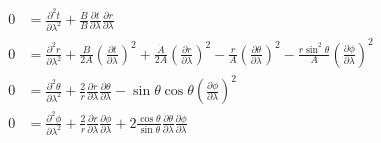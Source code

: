 \begin{subequations}
    \begin{align}
        0 & = \frac{\partial^2 t}{\partial \lambda^2} +
        \frac{\dot{B}}{B}
        \frac{\partial t}{\partial \lambda}\frac{\partial r}{\partial \lambda}       \\
        0 & = \frac{\partial^2 r}{\partial \lambda^2} +
        \frac{\dot{B}}{2A}\left(\frac{\partial t}{\partial \lambda}\right)^2 +
        \frac{\dot{A}}{2A}\left(\frac{\partial r}{\partial \lambda}\right)^2 -
        \frac{r}{A}\left(\frac{\partial \theta}{\partial \lambda}\right)^2 -
        \frac{r\sin^2\theta}{A}\left(\frac{\partial \phi}{\partial \lambda}\right)^2 \\
        0 & = \frac{\partial^2 \theta}{\partial \lambda^2} +
        \frac{2}{r} \frac{\partial r}{\partial \lambda}\frac{\partial \theta}{\partial \lambda} -
        \sin\theta\cos\theta \left(\frac{\partial \phi}{\partial \lambda}\right)^2   \\
        0 & = \frac{\partial^2 \phi}{\partial \lambda^2} +
        \frac{2}{r} \frac{\partial r}{\partial \lambda}\frac{\partial \phi}{\partial \lambda} +
        2\frac{\cos\theta}{\sin\theta} \frac{\partial \theta}{\partial \lambda}\frac{\partial \phi}{\partial \lambda}
    \end{align}
\end{subequations}

\problem


